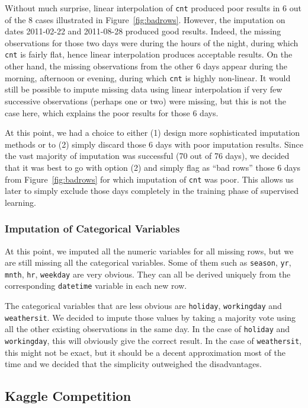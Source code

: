 \documentclass[12pt]{article}
\begin{document}
Without much surprise, linear interpolation of \texttt{cnt} produced poor results in 6 out of the 8 cases illustrated in Figure~\ref{fig:badrows}. However, the imputation on dates 2011-02-22 and 2011-08-28 produced good results. Indeed, the missing observations for those two days were during the hours of the night, during which \texttt{cnt} is fairly flat, hence linear interpolation produces acceptable results. On the other hand, the missing observations from the other 6 days appear during the morning, afternoon or evening, during which \texttt{cnt} is highly non-linear. It would still be possible to impute missing data using linear interpolation if very few successive observations (perhaps one or two) were missing, but this is not the case here, which explains the poor results for those 6 days.

At this point, we had a choice to either (1) design more sophisticated imputation methods or to (2) simply discard those 6 days with poor imputation results. Since the vast majority of imputation was successful (70 out of 76 days), we decided that it was best to go with option (2) and simply flag as ``bad rows'' those 6 days from Figure~\ref{fig:badrows} for which imputation of \texttt{cnt} was poor. This allows us later to simply exclude those days completely in the training phase of supervised learning.

\subsubsection{Imputation of Categorical Variables}

At this point, we imputed all the numeric variables for all missing rows, but we are still missing all the categorical variables. Some of them such as \texttt{season}, \texttt{yr}, \texttt{mnth}, \texttt{hr}, \texttt{weekday} are very obvious. They can all be derived uniquely from the corresponding \texttt{datetime} variable in each new row.

The categorical variables that are less obvious are \texttt{holiday}, \texttt{workingday} and \texttt{weathersit}. We decided to impute those values by taking a majority vote using all the other existing observations in the same day. In the case of \texttt{holiday} and \texttt{workingday}, this will obviously give the correct result. In the case of \texttt{weathersit}, this might not be exact, but it should be a decent approximation most of the time and we decided that the simplicity outweighed the disadvantages.


\subsection{Kaggle Competition}
\end{document}
